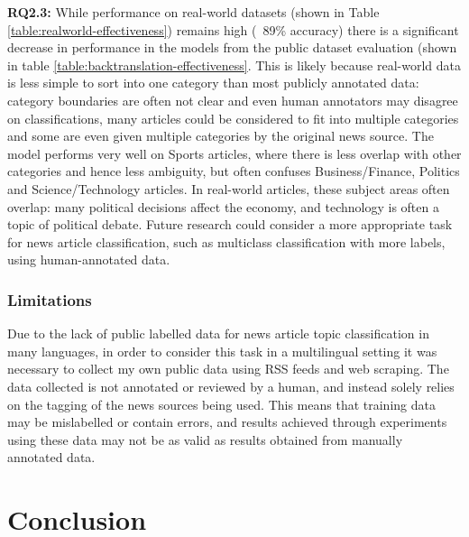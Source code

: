 \documentclass{l4proj}
\begin{document}
\textbf{RQ2.3: } While performance on real-world datasets (shown in Table \ref{table:realworld-effectiveness}) remains high (~89\% accuracy) there is a significant decrease in performance in the models from the public dataset evaluation (shown in table \ref{table:backtranslation-effectiveness}. This is likely because real-world data is less simple to sort into one category than most publicly annotated data: category boundaries are often not clear and even human annotators may disagree on classifications, many articles could be considered to fit into multiple categories and some are even given multiple categories by the original news source. The model performs very well on Sports articles, where there is less overlap with other categories and hence less ambiguity, but often confuses Business/Finance, Politics and Science/Technology articles. In real-world articles, these subject areas often overlap: many political decisions affect the economy, and technology is often a topic of political debate. Future research could consider a more appropriate task for news article classification, such as multiclass classification with more labels, using human-annotated data.

\subsection{Limitations}
Due to the lack of public labelled data for news article topic classification in many languages, in order to consider this task in a multilingual setting it was necessary to collect my own public data using RSS feeds and web scraping. The data collected is not annotated or reviewed by a human, and instead solely relies on the tagging of the news sources being used. This means that training data may be mislabelled or contain errors, and results achieved through experiments using these data may not be as valid as results obtained from manually annotated data. \par




\chapter{Conclusion}    
\end{document}
